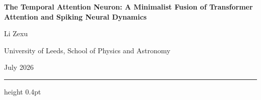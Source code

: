 \documentclass[11pt,a4paper]{article}
\theoremstyle{plain}
\theoremstyle{definition}
\begin{document}
\begin{center}
    {\LARGE\bfseries\color{accent} The Temporal Attention Neuron: A Minimalist Fusion of Transformer Attention and Spiking Neural Dynamics\par}
    \vspace{0.8em}
    {\small Li Zexu\par}
    \vspace{0.1em}
    {\footnotesize University of Leeds, School of Physics and Astronomy\par}
    \vspace{0.3em}
    {\footnotesize July 2026\par}
\end{center}
\vspace{0.5em}
\hrule height 0.4pt
\vspace{0.8em}



\vspace{0.8em}










\end{document}
